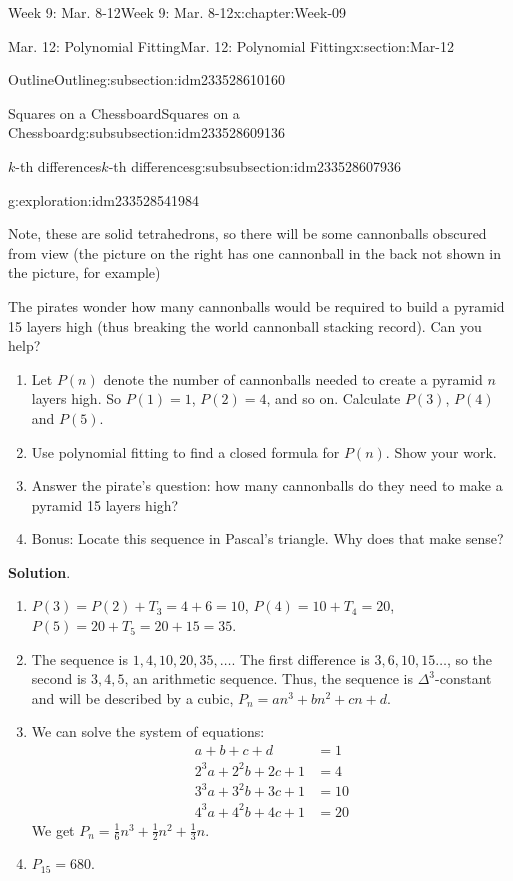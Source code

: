 \documentclass[oneside,10pt,]{book}
\newcommand{\blocktitlefont}{\relax}
\numberwithin{equation}{section}
\newcommand{\amp}{&}
\begin{document}
\begin{chapterptx}{Week 9: Mar. 8-12}{}{Week 9: Mar. 8-12}{}{}{x:chapter:Week-09}
\begin{sectionptx}{Mar. 12: Polynomial Fitting}{}{Mar. 12: Polynomial Fitting}{}{}{x:section:Mar-12}
\begin{subsectionptx}{Outline}{}{Outline}{}{}{g:subsection:idm233528610160}
\begin{subsubsectionptx}{Squares on a Chessboard}{}{Squares on a Chessboard}{}{}{g:subsubsection:idm233528609136}
\begin{subsubsectionptx}{\(k\)-th differences}{}{\(k\)-th differences}{}{}{g:subsubsection:idm233528607936}
\begin{exploration}{}{g:exploration:idm233528541984}
\par
Note, these are solid tetrahedrons, so there will be some cannonballs obscured from view (the picture on the right has one cannonball in the back not shown in the picture, for example)%
\par
The pirates wonder how many cannonballs would be required to build a pyramid 15 layers high (thus breaking the world cannonball stacking record). Can you help?%
\begin{enumerate}
\item{}Let \(P(n)\) denote the number of cannonballs needed to create a pyramid \(n\) layers high. So \(P(1) = 1\), \(P(2) = 4\), and so on. Calculate \(P(3)\), \(P(4)\) and \(P(5)\).%
\item{}Use polynomial fitting to find a closed formula for \(P(n)\). Show your work.%
\item{}Answer the pirate's question: how many cannonballs do they need to make a pyramid 15 layers high?%
\item{}Bonus: Locate this sequence in Pascal's triangle. Why does that make sense? %
\end{enumerate}
%
\par\smallskip%
\noindent\textbf{\blocktitlefont Solution}.\hypertarget{g:solution:idm233528524608}{}\quad{}%
\begin{enumerate}
\item{}\(P(3) = P(2) + T_3 = 4 + 6 = 10\), \(P(4) = 10 + T_4 = 20\), \(P(5) = 20 + T_5 = 20 + 15 = 35\).%
\item{}The sequence is \(1, 4, 10, 20, 35, \ldots\). The first difference is \(3, 6, 10, 15\ldots\), so the second is \(3, 4, 5\), an arithmetic sequence. Thus, the sequence is \(\Delta^3\)-constant and will be described by a cubic, \(P_n = a n^3 + b n^2 + cn + d\).%
\item{}We can solve the system of equations:%
%
\begin{align*}
a + b + c + d \amp= 1\\
2^3 a + 2^2 b + 2c + 1 \amp=4\\
3^3 a + 3^2 b + 3c + 1 \amp=10\\
4^3 a + 4^2 b + 4c + 1 \amp=20
\end{align*}
We get \(P_n = \frac{1}{6}n^3 + \frac{1}{2}n^2 + \frac{1}{3}n\).%
\item{}\(\displaystyle P_{15} = 680.\)%
\end{enumerate}
\end{exploration}%
\end{subsubsectionptx}

\end{subsubsectionptx}
\end{subsectionptx}
\end{sectionptx}
\end{chapterptx}
\end{document}
